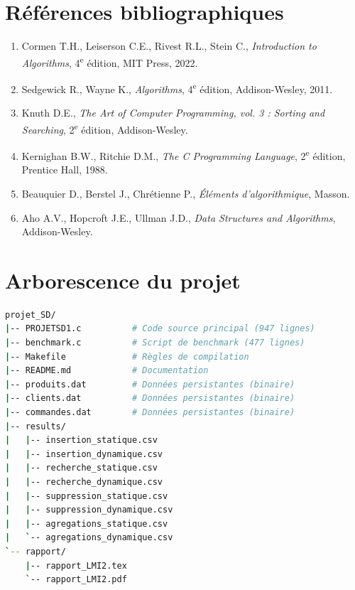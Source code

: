 \documentclass[12pt,a4paper]{report}
\begin{document}
\chapter*{Références bibliographiques}

\begin{enumerate}
    \item Cormen T.H., Leiserson C.E., Rivest R.L., Stein C., \textit{Introduction to Algorithms}, 4\textsuperscript{e} édition, MIT Press, 2022.
    \item Sedgewick R., Wayne K., \textit{Algorithms}, 4\textsuperscript{e} édition, Addison-Wesley, 2011.
    \item Knuth D.E., \textit{The Art of Computer Programming, vol. 3 : Sorting and Searching}, 2\textsuperscript{e} édition, Addison-Wesley.
    \item Kernighan B.W., Ritchie D.M., \textit{The C Programming Language}, 2\textsuperscript{e} édition, Prentice Hall, 1988.
    \item Beauquier D., Berstel J., Chrétienne P., \textit{Éléments d'algorithmique}, Masson.
    \item Aho A.V., Hopcroft J.E., Ullman J.D., \textit{Data Structures and Algorithms}, Addison-Wesley.
\end{enumerate}

\appendix
\chapter{Arborescence du projet}

\begin{lstlisting}[language=bash, caption={Organisation des fichiers du projet}]
projet_SD/
|-- PROJETSD1.c          # Code source principal (947 lignes)
|-- benchmark.c          # Script de benchmark (477 lignes)
|-- Makefile             # Règles de compilation
|-- README.md            # Documentation
|-- produits.dat         # Données persistantes (binaire)
|-- clients.dat          # Données persistantes (binaire)
|-- commandes.dat        # Données persistantes (binaire)
|-- results/
|   |-- insertion_statique.csv
|   |-- insertion_dynamique.csv
|   |-- recherche_statique.csv
|   |-- recherche_dynamique.csv
|   |-- suppression_statique.csv
|   |-- suppression_dynamique.csv
|   |-- agregations_statique.csv
|   `-- agregations_dynamique.csv
`-- rapport/
    |-- rapport_LMI2.tex
    `-- rapport_LMI2.pdf
\end{lstlisting}
\end{document}
